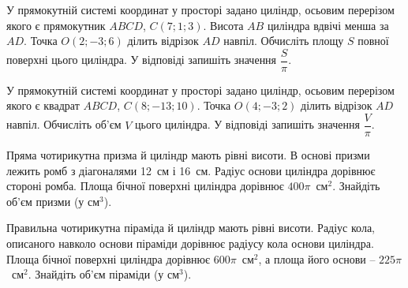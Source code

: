 \documentclass[12pt]{article}
\begin{document}
\begin{samepage}
\noindent\zadnum
У прямокутній системі координат у просторі задано циліндр, осьовим перерізом якого є прямокутник $ABCD$, $C(7; 1; 3)$. Висота $AB$ циліндра вдвічі менша за $AD$. Точка $O(2; -3; 6)$ ділить відрізок $AD$ навпіл. Обчисліть площу $S$ повної поверхні цього циліндра. У відповіді запишіть значення $\dfrac{S}{\pi}$. 

\nmtnobreak
\nopagebreak\nbvspace{0.5cm}
\nmtAnswerBox
\par{}
\end{samepage}

\begin{samepage}
\noindent\zadnum У прямокутній системі координат у просторі задано циліндр, осьовим перерізом якого є квадрат $ABCD$, $C(8; -13; 10)$. Точка $O(4; -3; 2)$ ділить відрізок $AD$ навпіл. Обчисліть об’єм $V$ цього циліндра. У відповіді запишіть значення $\dfrac{V}{\pi}$. 

\nmtnobreak
\nopagebreak\nbvspace{0.5cm}
\nmtAnswerBox
\par{}
\end{samepage}

\begin{samepage}
\noindent\zadnum Пряма чотирикутна призма й циліндр мають рівні висоти. В основі призми лежить ромб з діагоналями 12~см і 16~см. Радіус основи циліндра дорівнює стороні ромба. Площа бічної поверхні циліндра дорівнює $400\pi$~см$^2$. Знайдіть об’єм призми (у см$^3$). 

\nmtnobreak
\nopagebreak\nbvspace{0.5cm}
\nmtAnswerBox
\par{}
\end{samepage}

\begin{samepage}
\noindent\zadnum Правильна чотирикутна піраміда й циліндр мають рівні висоти. Радіус кола, описаного навколо основи піраміди дорівнює радіусу кола основи циліндра. Площа бічної поверхні циліндра дорівнює $600\pi$~см$^2$, а площа його основи – $225\pi$~см$^2$. Знайдіть об’єм піраміди (у см$^3$). 

\nmtnobreak
\nopagebreak\nbvspace{0.5cm}
\nmtAnswerBox
\par{}
\end{samepage}
\end{document}
